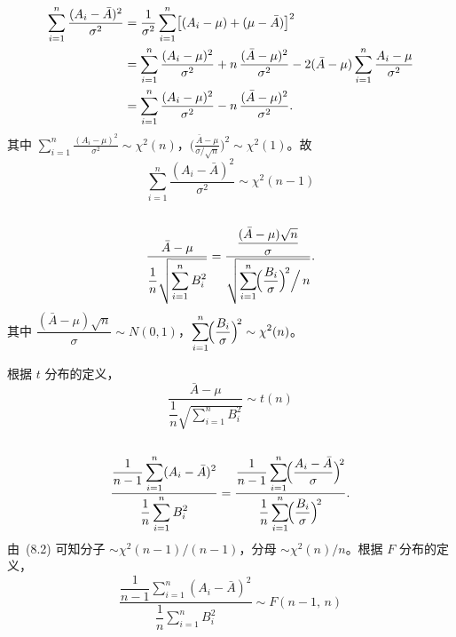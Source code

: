 \documentclass[12pt,a4paper]{article}
\begin{document}
\subsection{}

\begin{align}
  \sum_{i=1}^{n}\frac{(A_{i}-\bar{A})^{2}}{\sigma^{2}}
  &=\frac{1}{\sigma^{2}}\sum_{i=1}^{n}\bigl[(A_{i}-\mu)+(\mu-\bar{A})\bigr]^{2}\notag\\
  &=\sum_{i=1}^{n}\frac{(A_{i}-\mu)^{2}}{\sigma^{2}}
    +n\,\frac{(\bar{A}-\mu)^{2}}{\sigma^{2}}
    -2(\bar{A}-\mu)\sum_{i=1}^{n}\frac{A_{i}-\mu}{\sigma^{2}}\notag\\
  &=\sum_{i=1}^{n}\frac{(A_{i}-\mu)^{2}}{\sigma^{2}}
    -n\,\frac{(\bar{A}-\mu)^{2}}{\sigma^{2}}.\label{eq:decomp}
\end{align}
其中 $\displaystyle\sum_{i=1}^{n}\frac{(A_{i}-\mu)^{2}}{\sigma^{2}}\sim\chi^{2}(n)$，$\displaystyle\biggl(\frac{\bar{A}-\mu}{\sigma/\sqrt{n}}\biggr)^{\!2}\sim\chi^{2}(1)$。故
\[
  \boxed{\sum_{i=1}^{n}\frac{(A_{i}-\bar{A})^{2}}{\sigma^{2}}\sim\chi^{2}(n-1)}
\]

\subsection{}

\[
  \frac{\bar{A}-\mu}{\dfrac{1}{n}\sqrt{\displaystyle\sum_{i=1}^{n}B_{i}^{2}}}
  =\frac{\dfrac{(\bar{A}-\mu)\sqrt{n}}{\sigma}}
       {\sqrt{\displaystyle\sum_{i=1}^{n}\!\Bigl(\dfrac{B_{i}}{\sigma}\Bigr)^{\!2}\Big/\,n}}.
\]
其中 $\dfrac{(\bar{A}-\mu)\sqrt{n}}{\sigma}\sim N(0,1)$，$\displaystyle\sum_{i=1}^{n}\!\Bigl(\frac{B_{i}}{\sigma}\Bigr)^{\!2}\sim\chi^{2}(n)$。

根据 $t$ 分布的定义，
\[
  \boxed{\frac{\bar{A}-\mu}{\dfrac{1}{n}\sqrt{\displaystyle\sum_{i=1}^{n}B_{i}^{2}}}\sim t(n)}
\]

\subsection{}

\[
  \frac{\dfrac{1}{n-1}\displaystyle\sum_{i=1}^{n}(A_{i}-\bar{A})^{2}}
       {\dfrac{1}{n}\displaystyle\sum_{i=1}^{n}B_{i}^{2}}
  =\frac{\dfrac{1}{n-1}\displaystyle\sum_{i=1}^{n}\!\Bigl(\frac{A_{i}-\bar{A}}{\sigma}\Bigr)^{\!2}}
       {\dfrac{1}{n}\displaystyle\sum_{i=1}^{n}\!\Bigl(\frac{B_{i}}{\sigma}\Bigr)^{\!2}}.
\]
由~(8.2) 可知分子 $\sim\chi^{2}(n-1)/(n-1)$，分母 $\sim\chi^{2}(n)/n$。根据 $F$ 分布的定义，
\[
  \boxed{\frac{\dfrac{1}{n-1}\displaystyle\sum_{i=1}^{n}(A_{i}-\bar{A})^{2}}
       {\dfrac{1}{n}\displaystyle\sum_{i=1}^{n}B_{i}^{2}}\sim F(n-1,\,n)}
\]
\end{document}
